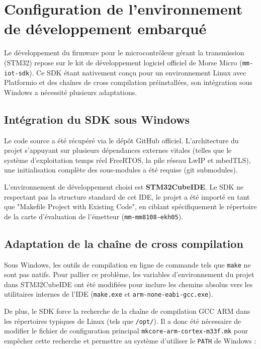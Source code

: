 \section{Configuration de l'environnement de développement embarqué}

Le développement du firmware pour le microcontrôleur gérant la transmission (STM32) repose sur 
le kit de développement logiciel officiel de Morse Micro (\texttt{mm-iot-sdk}). Ce SDK étant 
nativement conçu pour un environnement Linux avec Platformio et des chaînes de cross compilation 
préinstallées, son intégration sous Windows a nécessité plusieurs adaptations.



\subsection{Intégration du SDK sous Windows}
Le code source a été récupéré via le dépôt GitHub officiel. L'architecture du projet s'appuyant sur 
plusieurs dépendances externes vitales (telles que le système d'exploitation temps réel 
FreeRTOS, la pile réseau LwIP et mbedTLS), une initialisation complète des 
sous-modules a été requise (git submodules).

L'environnement de développement choisi est \textbf{STM32CubeIDE}. Le SDK ne 
respectant pas la structure standard de cet IDE, le projet a été importé en tant que "Makefile 
Project with Existing Code", en ciblant spécifiquement le répertoire de la carte d'évaluation de 
l'émetteur (\texttt{mm-mm8108-ekh05}).

\subsection{Adaptation de la chaîne de cross compilation}
Sous Windows, les outils de compilation en ligne de commande tels que \texttt{make} ne sont pas natifs. 
Pour pallier ce problème, les variables d'environnement du projet dans STM32CubeIDE ont été modifiées 
pour inclure les chemins absolus vers les utilitaires internes de l'IDE (\texttt{make.exe} et 
\texttt{arm-none-eabi-gcc.exe}).

De plus, le SDK force la recherche de la chaîne de compilation GCC ARM dans les répertoires 
typiques de Linux (tels que \texttt{/opt/}). Il a donc été nécessaire de modifier le fichier de configuration 
principal \texttt{mkcore-arm-cortex-m33f.mk} pour empêcher cette recherche et permettre au système d'utiliser 
le \texttt{PATH} de Windows :

